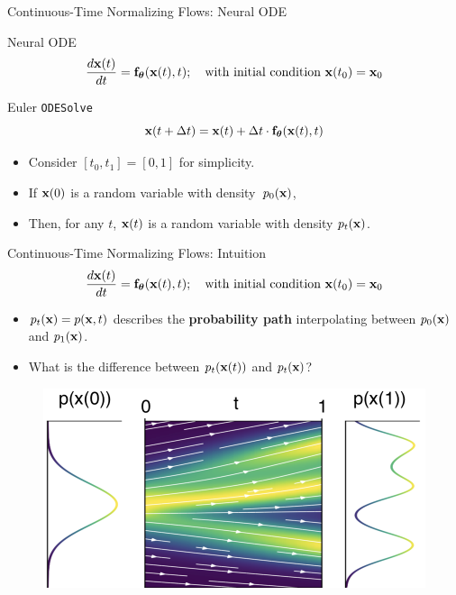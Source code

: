 \documentclass{beamer}
\begin{document}
\begin{frame}{Continuous-Time Normalizing Flows: Neural ODE}
	\begin{block}{Neural ODE}
		\vspace{-0.2cm}
		\[
  			\frac{d \mathbf{x}(t)}{dt} = \mathbf{f}_{\boldsymbol{\theta}}(\mathbf{x}(t), t); \quad \text{with initial condition }\mathbf{x}(t_0) = \mathbf{x}_0
		\]
		\vspace{-0.3cm}
	\end{block}
	\begin{block}{Euler \texttt{ODESolve}}
		\vspace{-0.3cm}
		\[
		    \mathbf{x}(t + \Delta t) = \mathbf{x}(t) + \Delta t \cdot \mathbf{f}_{\boldsymbol{\theta}}(\mathbf{x}(t), t)
		\]
		\vspace{-0.5cm}
	\end{block}
	\begin{itemize}
		\item Consider $[t_0, t_1] = [0, 1]$ for simplicity.
		\item If $\mathbf{x}(0)$ is a random variable with density~$p_0(\mathbf{x})$,
		\item Then, for any $t$, $\mathbf{x}(t)$ is a random variable with density $p_t(\mathbf{x})$.
	\end{itemize}
\end{frame}
\begin{frame}{Continuous-Time Normalizing Flows: Intuition}
	\[
 		\frac{d \mathbf{x}(t)}{dt} = \mathbf{f}_{\boldsymbol{\theta}}(\mathbf{x}(t), t); \quad \text{with initial condition }\mathbf{x}(t_0) = \mathbf{x}_0
	\]
	\vspace{-0.5cm}
	\begin{itemize}
		\item $p_t(\mathbf{x}) = p(\mathbf{x}, t)$ describes the \textbf{probability path} interpolating between $p_0(\mathbf{x})$ and $p_1(\mathbf{x})$.
		\item {\color{gray}What is the difference between $p_t(\mathbf{x}(t))$ and $p_t(\mathbf{x})$?}
	\end{itemize}
	\begin{figure}
		\centering
		\includegraphics[width=0.75\linewidth]{figs/cnf_flow.png}
	\end{figure}
\end{frame}
\end{document}
